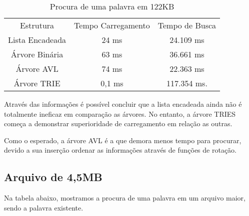 \documentclass[
	12pt,				%
    oneside,			%
	a4paper,			%
	english,			%
	french,				%
	spanish,			%
	brazil,				%
	]{abntex2}
\begin{document}
\begin{table}[!h]
\centering
    \begin{minipage}{0.7\hsize}
    \caption{Procura de uma palavra em 122KB}
\begin{tabular}{ccc}
\rowcolor[HTML]{FFCCC9}
Estrutura       & \multicolumn{1}{l}{\cellcolor[HTML]{FFCCC9}Tempo Carregamento} & \multicolumn{1}{l}{\cellcolor[HTML]{FFCCC9}Tempo de Busca} \\
\rowcolor[HTML]{C0C0C0}
Lista Encadeada & 24 ms                                                          & 24.109 ms                                                  \\
\rowcolor[HTML]{FFCCC9}
Árvore Binária  & 63 ms                                                          & 36.661 ms                                                  \\
\rowcolor[HTML]{C0C0C0}
Árvore AVL      & 74 ms                                                          & 22.363 ms                                                  \\
\rowcolor[HTML]{FFCCC9}
Árvore TRIE     & 0,1 ms                                                         & 117.354 ms.
\end{tabular}
\end{minipage}
\end{table}

    Através das informações é possível concluir que a lista encadeada ainda não é totalmente ineficaz em comparação as árvores. No entanto, a árvore TRIES começa a demonstrar superioridade de carregamento em relação as outras.

    Como o esperado, a árvore AVL é a que demora menos tempo para procurar, devido a sua inserção ordenar as informações através de funções de rotação.

\subsection{Arquivo de 4,5MB}
Na tabela abaixo, mostramos a procura de uma palavra em um arquivo maior, sendo a palavra existente.
\end{document}
